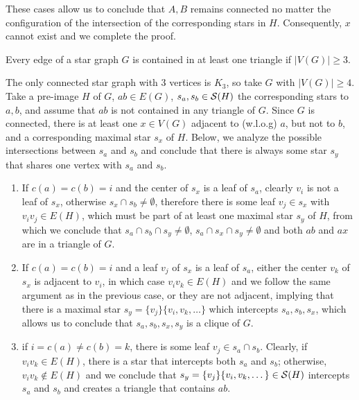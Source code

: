 \begin{tproof}
    These cases allow us to conclude that $A,B$ remains connected no matter the configuration of the intersection of the corresponding stars in $H$.
    Consequently, $x$ cannot exist and we complete the proof.
\end{tproof}


\begin{theorem}
    Every edge of a star graph $G$ is contained in at least one triangle if $|V(G)| \geq 3$.
\end{theorem}

\begin{tproof}
    The only connected star graph with 3 vertices is $K_3$, so take $G$ with $|V(G)| \geq 4$.
    Take a pre-image $H$ of $G$, $ab \in E(G)$, $s_a, s_b \in \mathcal{S}(H)$ the corresponding stars to $a, b$, and assume that $ab$ is not contained in any triangle of $G$.
    Since $G$ is connected, there is at least one $x \in V(G)$ adjacent to (w.l.o.g) $a$, but not to $b$, and a corresponding maximal star $s_x$ of $H$.
    Below, we analyze the possible intersections between $s_a$ and $s_b$ and conclude that there is always some star $s_y$ that shares one vertex with $s_a$ and $s_b$.
    \begin{enumerate}
        \item If $c(a) = c(b) = i$ and the center of $s_x$ is a leaf of $s_a$, clearly $v_i$ is not a leaf of $s_x$, otherwise $s_x \cap s_b \neq \emptyset$, therefore there is some leaf $v_j \in s_x$ with $v_iv_j \in E(H)$, which must be part of at least one maximal star $s_y$ of $H$, from which we conclude that $s_a \cap s_b \cap s_y \neq \emptyset$, $s_a \cap s_x \cap s_y \neq \emptyset$ and both $ab$ and $ax$ are in a triangle of $G$.
        \item If $c(a) = c(b) = i$ and a leaf $v_j$ of $s_x$ is a leaf of $s_a$, either the center $v_k$ of $s_x$ is adjacent to $v_i$, in which case $v_iv_k \in E(H)$ and we follow the same argument as in the previous case, or they are not adjacent, implying that there is a maximal star $s_y = \{v_j\}\{v_i, v_k, \dots\}$ which intercepts $s_a, s_b, s_x$, which allows us to conclude that $s_a, s_b, s_x, s_y$ is a clique of $G$.
        \item if $i = c(a) \neq c(b) = k$, there is some leaf $v_j \in s_a \cap s_b$. Clearly, if $v_iv_k \in E(H)$, there is a star that intercepts both $s_a$ and $s_b$;
        otherwise, $v_iv_k \notin E(H)$ and we conclude that $s_y = \{v_j\}\{v_i, v_k, \dots\} \in \mathcal{S}(H)$ intercepts $s_a$ and $s_b$ and creates a triangle that contains $ab$.
    \end{enumerate}
\end{tproof}

